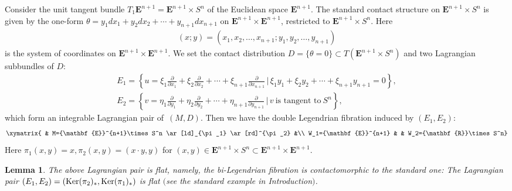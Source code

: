 \documentclass[pdftex]{sigma}
\newtheorem{Lem}[Th]{Lemma}
{ \theoremstyle{definition}
\newtheorem{Def}[Th]{Definition}
\newtheorem{Rem}[Th]{Remark}
\newtheorem{Ex}[Th]{Example}}
\begin{document}
Consider the unit tangent bundle $T_1{\mathbf{E}}^{n+1}={\mathbf{E}}^{n+1}\times S^n$
of the Euclidean space ${\mathbf{E}}^{n+1}$.
The standard contact structure on ${\mathbf{E}}^{n+1}\times S^n$
is
given by the one-form $\theta
= y_1dx_1 + y_2dx_2 + \cdots + y_{n+1}dx_{n+1}$ on
${\mathbf{E}}^{n+1}\times {\mathbf{E}}^{n+1}$,
restricted to ${\mathbf{E}}^{n+1}\times S^n$.
Here
\begin{gather*}
(x;y)=(x_1,x_2,\dots,x_{n+1};y_1,y_2,\dots,y_{n+1})
\end{gather*}
is the system of coordinates on ${\mathbf{E}}^{n+1}\times {\mathbf{E}}^{n+1}$.
We set the contact distribution $D=\{ \theta = 0 \} \subset
T({\mathbf{E}}^{n+1}\times S^n)$ and two Lagrangian subbundles of $D$:
\begin{gather*}
E_1
=\left\{ u = \xi_1 \frac{\partial}{\partial x_1}+
\xi_2 \frac{\partial}{\partial x_2}+\cdots +
\xi_{n+1}\frac{\partial}{\partial x_{n+1}}
\,\Big|\, \xi_1y_1+\xi_2y_2+\cdots +\xi_{n+1}y_{n+1}=0 \right\},
\\
E_2
=\left\{ v=\eta_1 \frac{\partial}{\partial y_1}+
\eta_2 \frac{\partial}{\partial y_2}+\cdots +
\eta_{n+1}\frac{\partial}{\partial y_{n+1}}
\,\Big|\, v\ \text{is tangent to}\ S^n \right\},
\end{gather*}
which form an integrable Lagrangian pair of~$(M, D)$.
Then we have the double Legendrian f\/ibration induced by $(E_1,E_2)$:
\begin{gather*}
\xymatrix{
& M={\mathbf{E}}^{n+1}\times S^n \ar[ld]_{\pi_1} \ar[rd]^{\pi_2}  &\\
W_1={\mathbf{E}}^{n+1} &  & W_2={\mathbf{R}}\times S^n}
\end{gather*}
Here $\pi_1(x,y)=x, \pi_2(x,y)=(x\cdot y,y)$ for
$(x,y)\in {\mathbf{E}}^{n+1}\times S^n \subset {\mathbf{E}}^{n+1} \times {\mathbf{E}}^{n+1}$.

\begin{Lem}
\label{Euclid-M-A}
The above Lagrangian pair is f\/lat, namely, the bi-Legendrian f\/ibration is
contactomorphic to the standard one: The Lagrangian pair $(E_1, E_2) = ({\rm Ker}(\pi_2)_*, {\rm Ker}(\pi_1)_*)$
is flat
$($see the standard example in Introduction$)$.
\end{Lem}
\end{document}
